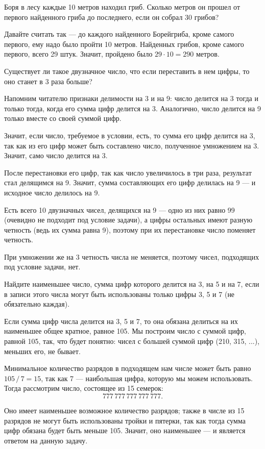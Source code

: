 ﻿


\begin{itemize}

	\itA Боря в лесу каждые 10 метров находил гриб. Сколько метров он прошел от первого найденного гриба до последнего, если он собрал 30 грибов?
	
	\itr Давайте считать так — до каждого найденного Борей\linebreak гриба, кроме самого первого, ему надо было пройти 10 метров. Найденных грибов, кроме самого первого, всего 29 штук. Значит, пройдено было $29 \cdot 10 = 290$ метров.
	
	\itB Существует ли такое двузначное число, что если переставить в нем цифры, то оно станет в 3 раза больше?
	
	\itr Напомним читателю признаки делимости на 3 и на 9: число делится на 3 тогда и только тогда, когда его сумма цифр делится на 3. Аналогично, число делится на 9 только вместе со своей суммой цифр.
	
	Значит, если число, требуемое в условии, есть, то сумма его цифр делится на 3, так как из его цифр может быть составлено число, полученное умножением на 3. Значит, само число делится на 3.
	
	После перестановки его цифр, так как число увеличилось в три раза, результат стал делящимся на 9. Значит, сумма составляющих его цифр делилась на  9 — и исходное число делилось на 9.
	
	Есть всего 10 двузначных чисел, делящихся на 9 — одно из них равно 99 (очевидно не подходит под условие задачи), а цифры остальных имеют разную четность (ведь их сумма равна 9), поэтому при их перестановке число поменяет четность.
	
	При умножении же на 3 четность числа не меняется, поэтому чисел, подходящих под условие задачи, нет.
	
	\itC Найдите наименьшее число, сумма цифр которого делится на 3, на 5 и на 7, если в записи этого числа могут быть использованы только цифры 3, 5 и 7 (не обязательно каждая).
	
	\itr Если сумма цифр числа делится на 3, 5 и 7, то она обязана делиться на их наименьшее общее кратное, равное 105. Мы построим число с суммой цифр, равной 105, так, что будет понятно: чисел с большей суммой цифр (210, 315, ...), меньших его, не бывает.
	
	Минимальное количество разрядов в подходящем нам числе может быть равно $105\,/\,7 = 15$, так как 7 — наибольшая цифра, которую мы можем использовать. Тогда рассмотрим число, состоящее из 15 семерок:
	$$777\,777\,777\,777\,777.$$
	
	Оно имеет наименьшее возможное количество разрядов; также в числе из 15 разрядов не могут быть использованы тройки и пятерки, так как тогда сумма цифр обязана будет быть меньше 105. Значит, оно наименьшее — и является ответом на данную задачу.

\end{itemize}

